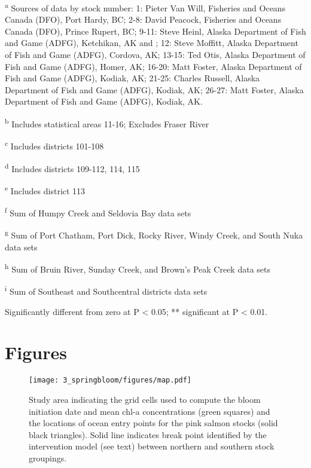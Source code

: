 \begin{landscape}



\noindent \textsuperscript{a} Sources of data by stock number: 1: Pieter Van Will,
Fisheries and Oceans Canada (DFO), Port Hardy, BC; 2-8: David Peacock, Fisheries
and Oceans Canada (DFO), Prince Rupert, BC; 9-11: Steve Heinl, Alaska Department
of Fish and Game (ADFG), Ketchikan, AK and \citet{Piston2011a}; 12: Steve Moffitt,
Alaska Department of Fish and Game (ADFG), Cordova, AK; 13-15: Ted Otis, Alaska
Department of Fish and Game (ADFG), Homer, AK; 16-20: Matt Foster, Alaska
Department of Fish and Game (ADFG), Kodiak, AK; 21-25: Charles Russell, Alaska
Department of Fish and Game (ADFG), Kodiak, AK; 26-27: Matt Foster, Alaska
Department of Fish and Game (ADFG), Kodiak, AK.

\noindent \textsuperscript{b} Includes statistical areas 11-16; Excludes Fraser River

\noindent \textsuperscript{c} Includes districts 101-108

\noindent \textsuperscript{d} Includes districts 109-112, 114, 115

\noindent \textsuperscript{e} Includes district 113

\noindent \textsuperscript{f} Sum of Humpy Creek and Seldovia Bay data sets

\noindent \textsuperscript{g} Sum of Port Chatham, Port Dick, Rocky River, Windy Creek,
and South Nuka data sets

\noindent \textsuperscript{h} Sum of Bruin River, Sunday Creek, and Brown's Peak Creek data sets

\noindent \textsuperscript{i} Sum of Southeast and Southcentral districts data sets

\newpage




\noindent * Significantly different from zero at P \textless{} 0.05; **
significant at P \textless{} 0.01.

\end{landscape}
\newpage




\section{Figures}

\begin{figure}[htbp]
  \centering \texttt{[image: 3\_springbloom/figures/map.pdf]}
  \caption{Study area indicating the grid cells used to compute the bloom
    initiation date and mean chl-a concentrations (green squares) and the
    locations of ocean entry points for the pink salmon stocks (solid black
    triangles). Solid line indicates break point identified by the intervention
    model (see text) between northern and southern stock groupings.}
  \label{fig:bloom:1}
\end{figure}

